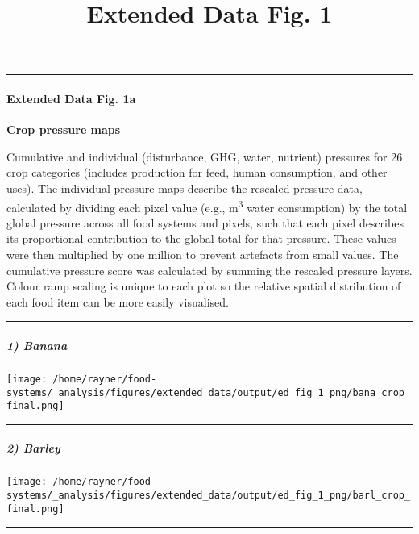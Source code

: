 \documentclass[
]{article}
\title{Extended Data Fig. 1}
\author{}
\date{\vspace{-2.5em}}
\begin{document}
\maketitle

{
\setcounter{tocdepth}{5}
\tableofcontents
}
\begin{center}\rule{0.5\linewidth}{0.5pt}\end{center}

\hypertarget{extended-data-fig.-1a}{%
\paragraph{Extended Data Fig. 1a}\label{extended-data-fig.-1a}}

\textbf{Crop pressure maps}

Cumulative and individual (disturbance, GHG, water, nutrient) pressures
for 26 crop categories (includes production for feed, human consumption,
and other uses). The individual pressure maps describe the rescaled
pressure data, calculated by dividing each pixel value (e.g.,
m\textsuperscript{3} water consumption) by the total global pressure
across all food systems and pixels, such that each pixel describes its
proportional contribution to the global total for that pressure. These
values were then multiplied by one million to prevent artefacts from
small values. The cumulative pressure score was calculated by summing
the rescaled pressure layers. Colour ramp scaling is unique to each plot
so the relative spatial distribution of each food item can be more
easily visualised.

\begin{center}\rule{0.5\linewidth}{0.5pt}\end{center}

\hypertarget{banana}{%
\subparagraph{1) Banana}\label{banana}}

\texttt{[image: /home/rayner/food-systems/\_analysis/figures/extended\_data/output/ed\_fig\_1\_png/bana\_crop\_final.png]}

\begin{center}\rule{0.5\linewidth}{0.5pt}\end{center}

\hypertarget{barley}{%
\subparagraph{2) Barley}\label{barley}}

\texttt{[image: /home/rayner/food-systems/\_analysis/figures/extended\_data/output/ed\_fig\_1\_png/barl\_crop\_final.png]}

\begin{center}\rule{0.5\linewidth}{0.5pt}\end{center}
\end{document}
